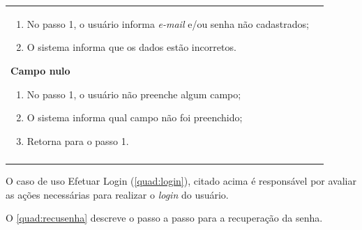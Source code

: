 \begin{quadro}[H]
\begin{tabular}{p{1.35in}p{3.94in}}
{\begin{enumerate}[label*={\fontsize{12pt}{12pt}\selectfont \arabic*.}]
	\item No passo 1, o usuário informa \textit{e-mail} e/ou senha não cadastrados; \par 	\item O sistema informa que os dados estão incorretos.
\end{enumerate} \par \textbf{Campo nulo} \par \begin{enumerate}[label*={\fontsize{12pt}{12pt}\selectfont \arabic*.}]
	\item No passo 1, o usuário não preenche algum campo; \par 	\item O sistema informa qual campo não foi preenchido; \par 	\item Retorna para o passo 1.
\end{enumerate}} \\
\hhline{--}

\end{tabular}
\end{quadro}


O caso de uso Efetuar Login (\autoref{quad:login}), citado acima é responsável por avaliar as ações necessárias para realizar o \textit{login }do usuário. 

O \autoref{quad:recusenha} descreve o passo a passo para a recuperação da senha.



